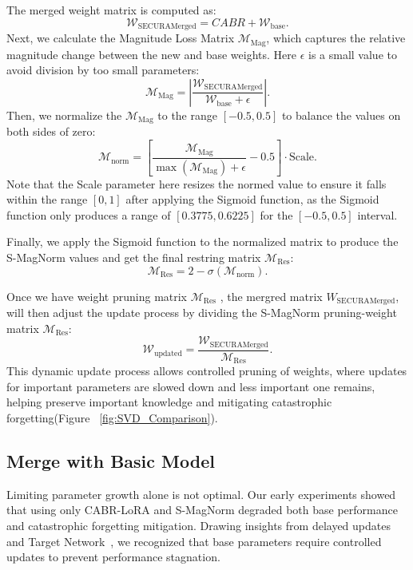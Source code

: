 The merged weight matrix is computed as:
\begin{equation}
    \mathcal{W}_{\text{SECURAMerged}} = CABR + \mathcal{W}_{\text{base}}.
\end{equation}
Next, we calculate the Magnitude Loss Matrix \(\mathcal{M}_{\text{Mag}}\), which captures the relative magnitude change between the new and base weights. Here \(\epsilon\) is a  small value to avoid division by too small parameters:
\begin{equation}
    \mathcal{M}_{\text{Mag}} = \left| \frac{\mathcal{W}_{\text{SECURAMerged}}}{\mathcal{W}_{\text{base}} + \epsilon} \right|.
\end{equation}
Then, we normalize the \(\mathcal{M}_{\text{Mag}}\) to the range \([-0.5, 0.5]\) to balance the values on both sides of zero:
\begin{equation}
    \mathcal{M}_{\text{norm}} = \left[ \frac{\mathcal{M}_{\text{Mag}}}{\max(\mathcal{M}_{\text{Mag}}) + \epsilon} - 0.5 \right] \cdot \text{Scale}.
\end{equation}
Note that the Scale parameter here resizes the normed value to ensure it falls within the range \([0,1]\) after applying the Sigmoid function, as the Sigmoid function only produces a range of \([0.3775, 0.6225]\) for the \([-0.5, 0.5]\) interval.

Finally, we apply the Sigmoid function to the normalized matrix to produce the S-MagNorm values and get the final restring matrix \(\mathcal{M}_{\text{Res}}\):
\begin{equation}
    \mathcal{M}_{\text{Res}} = 2 - \sigma\left(\mathcal{M}_{\text{norm}}\right).
\end{equation}

Once we have weight pruning matrix \(\mathcal{M}_{\text{Res}}\) , the mergred matrix \( W_{\text{SECURAMerged}} \), will then adjust the update process by dividing the S-MagNorm pruning-weight matrix \(\mathcal{M}_{\text{Res}}\):
\begin{equation}
    \mathcal{W}_{\text{updated}} = \frac{\mathcal{W}_{\text{SECURAMerged}}}{\mathcal{M}_{\text{Res}}}.
\end{equation}
This dynamic update process allows controlled pruning of weights, where updates for important parameters are slowed down and less important one remains, helping preserve important knowledge and mitigating catastrophic forgetting(Figure ~\ref{fig:SVD_Comparison}).

\subsection{Merge with Basic Model}
Limiting parameter growth alone is not optimal. Our early experiments showed that using only CABR-LoRA and S-MagNorm degraded both base performance and catastrophic forgetting mitigation. Drawing insights from delayed updates~\citep{kosta2020cost} and Target Network~\citep{gao2017adaptive}, we recognized that base parameters require controlled updates to prevent performance stagnation.

